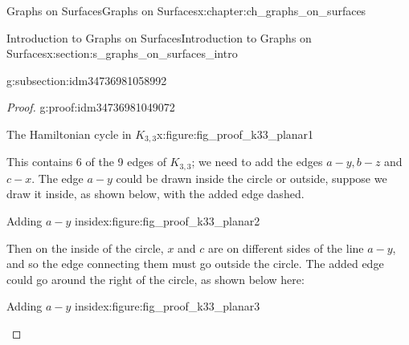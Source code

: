 \documentclass[oneside,10pt,]{book}
\numberwithin{equation}{section}
\begin{document}
\begin{chapterptx}{Graphs on Surfaces}{}{Graphs on Surfaces}{}{}{x:chapter:ch_graphs_on_surfaces}
\begin{sectionptx}{Introduction to Graphs on Surfaces}{}{Introduction to Graphs on Surfaces}{}{}{x:section:s_graphs_on_surfaces_intro}
\begin{subsectionptx}{}{}{}{}{}{g:subsection:idm34736981058992}
\begin{proof}{}{g:proof:idm34736981049072}
\begin{figureptx}{The Hamiltonian cycle in \(K_{3,3}\)}{x:figure:fig_proof_k33_planar1}{}
\begin{image}{0.15}{0.7}{0.15}%
%
\end{image}%
\tcblower
\end{figureptx}%
This contains 6 of the 9 edges of \(K_{3,3}\); we need to add the edges \(a-y, b-z\) and \(c-x\).  The edge \(a-y\) could be drawn inside the circle or outside, suppose we draw it inside, as shown below, with the added edge dashed.%
\begin{figureptx}{Adding \(a-y\) inside}{x:figure:fig_proof_k33_planar2}{}%
\begin{image}{0.15}{0.7}{0.15}%
%
\end{image}%
\tcblower
\end{figureptx}%
Then on the inside of the circle, \(x\) and \(c\) are on different sides of the line \(a-y\), and so the edge connecting them must go outside the circle.  The added edge could go around the right of the circle, as shown below here:%
\begin{figureptx}{Adding \(a-y\) inside}{x:figure:fig_proof_k33_planar3}{}%
\begin{image}{0.15}{0.7}{0.15}%
\end{image}
\end{figureptx}
\end{proof}
\end{subsectionptx}
\end{sectionptx}
\end{chapterptx}
\end{document}
